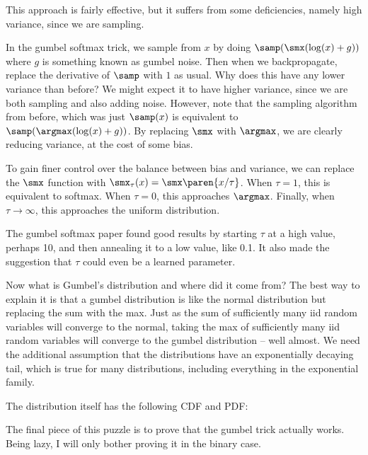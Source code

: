 \documentclass[12pt]{article}
\begin{document}
This approach is fairly effective, but it suffers from some deficiencies, namely high variance, since we are sampling.

In the gumbel softmax trick, we sample from $x$ by doing $\samp(\smx(\log(x)+g))$ where $g$ is something known as gumbel noise. Then when we backpropagate, replace the derivative of $\samp$ with $1$ as usual. Why does this have any lower variance than before? We might expect it to have higher variance, since we are both sampling and also adding noise. However, note that the sampling algorithm from before, which was just $\samp(x)$ is equivalent to $\samp(\argmax(\log(x)+g))$. By replacing $\smx$ with $\argmax$, we are clearly reducing variance, at the cost of some bias.

To gain finer control over the balance between bias and variance, we can replace the $\smx$ function with $\smx_\tau(x) = \smx\paren{x/\tau}$. When $\tau = 1$, this is equivalent to softmax. When $\tau = 0$, this approaches $\argmax$. Finally, when $\tau \rightarrow \infty$, this approaches the uniform distribution.

The gumbel softmax paper found good results by starting $\tau$ at a high value, perhaps 10, and then annealing it to a low value, like 0.1. It also made the suggestion that $\tau$ could even be a learned parameter. 

Now what is Gumbel's distribution and where did it come from? The best way to explain it is that a gumbel distribution is like the normal distribution but replacing the sum with the max. Just as the sum of sufficiently many iid random variables will converge to the normal, taking the max of sufficiently many iid random variables will converge to the gumbel distribution -- well almost. We need the additional assumption that the distributions have an exponentially decaying tail, which is true for many distributions, including everything in the exponential family.

The distribution itself has the following CDF and PDF:


The final piece of this puzzle is to prove that the gumbel trick actually works. Being lazy, I will only bother proving it in the binary case. 
\end{document}
